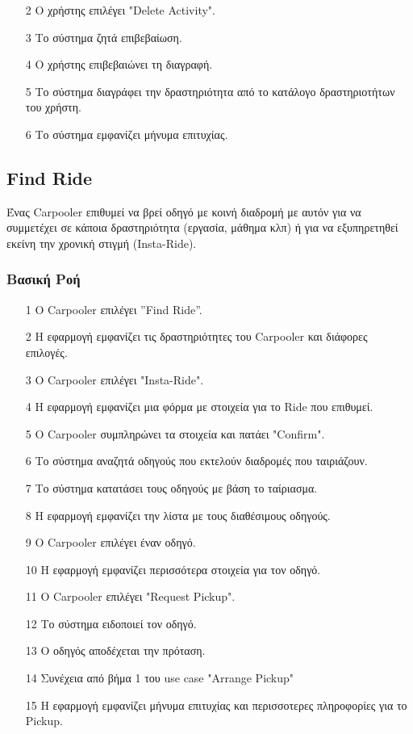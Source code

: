 \begin{enumerate}
    \item[2] Ο χρήστης επιλέγει "Delete Activity".
    \item[3] Το σύστημα ζητά επιβεβαίωση.
    \item[4] Ο χρήστης επιβεβαιώνει τη διαγραφή.
    \item[5] Το σύστημα διαγράφει την δραστηριότητα από το κατάλογο δραστηριοτήτων του χρήστη.
    \item[6] Το σύστημα εμφανίζει μήνυμα επιτυχίας.
\end{enumerate}

\subsection{Find Ride}

Ένας Carpooler επιθυμεί να βρεί οδηγό με κοινή διαδρομή με αυτόν για να συμμετέχει
σε κάποια δραστηριότητα (εργασία, μάθημα κλπ) ή για να εξυπηρετηθεί εκείνη την
χρονική στιγμή (Insta-Ride).

\subsubsection{Βασική Ροή}

\begin{enumerate}
    \item[1] Ο Carpooler επιλέγει ”Find Ride”.
    \item[2] Η εφαρμογή εμφανίζει τις δραστηριότητες του Carpooler και διάφορες επιλογές.
    \item[3] Ο Carpooler επιλέγει "Insta-Ride".
    \item[4] Η εφαρμογή εμφανίζει μια φόρμα με στοιχεία για το Ride που επιθυμεί.
    \item[5] Ο Carpooler συμπληρώνει τα στοιχεία και πατάει "Confirm".
    \item[6] Το σύστημα αναζητά οδηγούς που εκτελούν διαδρομές που ταιριάζουν.
    \item[7] Το σύστημα κατατάσει τους οδηγούς με βάση το ταίριασμα.
    \item[8] Η εφαρμογή εμφανίζει την λίστα με τους διαθέσιμους οδηγούς.
    \item[9] Ο Carpooler επιλέγει έναν οδηγό.
    \item[10] Η εφαρμογή εμφανίζει περισσότερα στοιχεία για τον οδηγό.
    \item[11] Ο Carpooler επιλέγει "Request Pickup".
    \item[12] Το σύστημα ειδοποιεί τον οδηγό.
    \item[13] Ο οδηγός αποδέχεται την πρόταση.
    \item[14] Συνέχεια από βήμα 1 του use case "Arrange Pickup"
    \item[15] Η εφαρμογή εμφανίζει μήνυμα επιτυχίας και περισσοτερες πληροφορίες για το Pickup. %
\end{enumerate}

